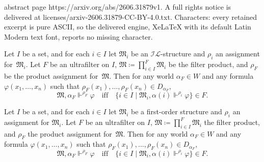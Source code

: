 \documentclass[10pt,a4paper]{amsart}
\newcommand{\IL}{\mathscr{I\!\!L}}   %
\newcommand{\mo}{\mathfrak}
\newcommand{\satisfySym}{\Vdash}
\newcommand{\satisfy}[4]{#1, #2 \satisfySym^{#4} #3}
\renewcommand{\iff}{\quad\text{iff}\quad}
\renewcommand{\phi}{\varphi}
\begin{document}
abstract page https://arxiv.org/abs/2606.31879v1. A full rights notice is delivered at licenses/arxiv-2606.31879-CC-BY-4.0.txt. Characters: every retained excerpt is pure ASCII, so the delivered engine, XeLaTeX with its default Latin Modern text font, reports no missing character.
\begin{theorem}\label{thm:Los}
  Let $I$ be a set, and for each $i \in I$ let $\mo{M}_i$ be an $\IL$-structure
  and $\rho_i$ an assignment for~$\mo{M}_i$.
  Let $F$ be an ultrafilter on $I$,
  $\mo{M} \coloneq \prod_{i \in I}^F \mo{M}_i$ be the filter product,
  and $\rho_F$ be
  the product assignment for~$\mo{M}$.
  Then for any world $\alpha_F \in W$ and any formula $\phi(x_1, \ldots, x_n)$
  such that $\rho_F(x_1), \ldots, \rho_F(x_n) \in D_{\alpha_F}$,
  \begin{equation*}
    \satisfy{\mo{M}}{\alpha_F}{\phi}{\rho_F}
      \iff \{ i \in I \mid \satisfy{\mo{M}_i}{\alpha(i)}{\phi}{\rho_i} \} \in F.
  \end{equation*}
\end{theorem}

\begin{theorem}
  Let $I$ be a set, and for each $i \in I$ let $\mo{M}_i$ be a
  first-order structure and $\rho_i$ an assignment for $\mo{M}_i$.
  Let $F$ be an ultrafilter on $I$,
  $\mo{M} \coloneq \prod_{i \in I}^F \mo{M}_i$ the filter product,
  and $\rho_F$ the product assignment for~$\mo{M}$.
  Then for any world $\alpha_F \in W$ and any formula $\phi(x_1, \ldots, x_n)$
  such that $\rho_F(x_1), \ldots, \rho_F(x_n) \in D_{\alpha_F}$,
  \begin{equation*}
    \satisfy{\mo{M}}{\alpha_F}{\phi}{\rho_F}
      \iff \{ i \in I \mid \satisfy{\mo{M}_i}{\alpha(i)}{\phi}{\rho_i} \} \in F.
  \end{equation*}
\end{theorem}
\end{document}
